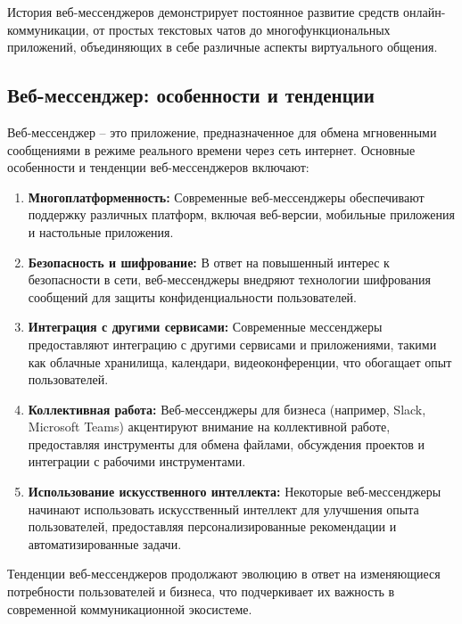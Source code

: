 История веб-мессенджеров демонстрирует постоянное развитие средств онлайн-коммуникации, от простых текстовых чатов до многофункциональных приложений, объединяющих в себе различные аспекты виртуального общения.

\subsection{Веб-мессенджер: особенности и тенденции}
Веб-мессенджер – это приложение, предназначенное для обмена мгновенными сообщениями в режиме реального времени через сеть интернет. Основные особенности и тенденции веб-мессенджеров включают:

\begin{enumerate}
	\item \textbf{Многоплатформенность:} Современные веб-мессенджеры обеспечивают поддержку различных платформ, включая веб-версии, мобильные приложения и настольные приложения.
	
	\item \textbf{Безопасность и шифрование:} В ответ на повышенный интерес к безопасности в сети, веб-мессенджеры внедряют технологии шифрования сообщений для защиты конфиденциальности пользователей.
	
	\item \textbf{Интеграция с другими сервисами:} Современные мессенджеры предоставляют интеграцию с другими сервисами и приложениями, такими как облачные хранилища, календари, видеоконференции, что обогащает опыт пользователей.
	
	\item \textbf{Коллективная работа:} Веб-мессенджеры для бизнеса (например, Slack, Microsoft Teams) акцентируют внимание на коллективной работе, предоставляя инструменты для обмена файлами, обсуждения проектов и интеграции с рабочими инструментами.
	
	\item \textbf{Использование искусственного интеллекта:} Некоторые веб-мессенджеры начинают использовать искусственный интеллект для улучшения опыта пользователей, предоставляя персонализированные рекомендации и автоматизированные задачи.
	
\end{enumerate}

Тенденции веб-мессенджеров продолжают эволюцию в ответ на изменяющиеся потребности пользователей и бизнеса, что подчеркивает их важность в современной коммуникационной экосистеме.

